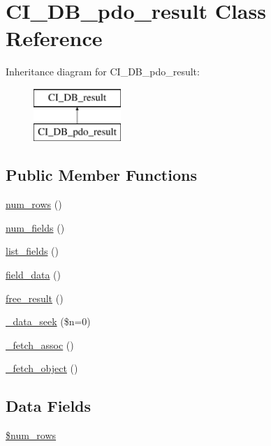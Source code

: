 \hypertarget{class_c_i___d_b__pdo__result}{\section{C\-I\-\_\-\-D\-B\-\_\-pdo\-\_\-result Class Reference}
\label{class_c_i___d_b__pdo__result}
}
Inheritance diagram for C\-I\-\_\-\-D\-B\-\_\-pdo\-\_\-result\-:\begin{figure}[H]
\begin{center}
\leavevmode
\includegraphics[height=2.000000cm]{class_c_i___d_b__pdo__result}
\end{center}
\end{figure}
\subsection*{Public Member Functions}
\begin{DoxyCompactItemize}
\item 
\hyperlink{class_c_i___d_b__pdo__result_a218657c303ee499b97710ab0cd2f5d6e}{num\-\_\-rows} ()
\item 
\hyperlink{class_c_i___d_b__pdo__result_af831bf363e4d7d661a717a4932af449d}{num\-\_\-fields} ()
\item 
\hyperlink{class_c_i___d_b__pdo__result_a50b54eb4ea7cfd039740f532988ea776}{list\-\_\-fields} ()
\item 
\hyperlink{class_c_i___d_b__pdo__result_a84bffd65e53902ade1591716749a33e3}{field\-\_\-data} ()
\item 
\hyperlink{class_c_i___d_b__pdo__result_aad2d98d6beb3d6095405356c6107b473}{free\-\_\-result} ()
\item 
\hyperlink{class_c_i___d_b__pdo__result_aeba9dd69307793342d1c81ccb3e55ff9}{\-\_\-data\-\_\-seek} (\$n=0)
\item 
\hyperlink{class_c_i___d_b__pdo__result_a43a9a92817f1334a1c10752ec44275a0}{\-\_\-fetch\-\_\-assoc} ()
\item 
\hyperlink{class_c_i___d_b__pdo__result_a236bae79bb43606aa86598719b281c1f}{\-\_\-fetch\-\_\-object} ()
\end{DoxyCompactItemize}
\subsection*{Data Fields}
\begin{DoxyCompactItemize}
\item 
\hyperlink{class_c_i___d_b__pdo__result_ac926549b713e71c5f5fd63999cebfb8c}{\$num\-\_\-rows}
\end{DoxyCompactItemize}
